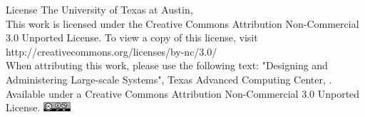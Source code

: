 
\begin{frame}{License}
\footnotesize
\textcopyright The University of Texas at Austin, \the\year\\
\vspace{0.5 cm}
This work is licensed under the Creative Commons Attribution Non-Commercial 3.0 Unported License. To view a copy of this license, 
visit http://creativecommons.org/licenses/by-nc/3.0/\\
\vspace{0.5 cm}
When attributing this work, please use the following text: 
"Designing and Administering Large-scale Systems", Texas Advanced Computing Center, \the\year. Available under a Creative Commons Attribution Non-Commercial 3.0 Unported License.
\newline
\newline
\includegraphics[width=1cm]{./figures/cc.png}
\end{frame}